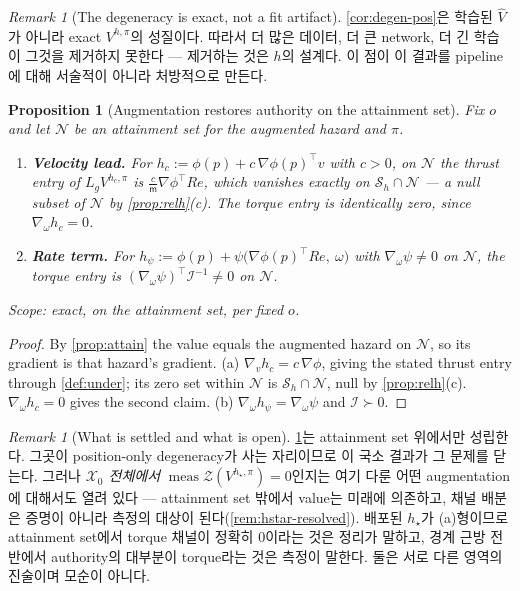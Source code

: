 \documentclass[11pt]{article}
\theoremstyle{plain}
\newtheorem{proposition}[theorem]{Proposition}
\theoremstyle{definition}
\theoremstyle{remark}
\newtheorem{remark}[theorem]{Remark}
\newcommand{\calX}{\mathcal{X}}
\newcommand{\Vhp}[1]{V^{h,#1}}
\newcommand{\Vhpi}{\Vhp{\pi}}
\newcommand{\Vhat}{\widehat V}
\newcommand{\mass}{\mathsf m}
\newcommand{\inertia}{\mathcal I}
\newcommand{\Lg}{L_g}
\newcommand{\grad}{\nabla}
\newcommand{\eqdef}{:=}
\begin{document}
\begin{remark}[The degeneracy is exact, not a fit artifact]\label{rem:vhat}
\cref{cor:degen-pos}은 학습된 $\Vhat$가 아니라 exact $\Vhpi$의 성질이다. 따라서 더 많은 데이터,
더 큰 network, 더 긴 학습이 그것을 제거하지 못한다 --- 제거하는 것은 $h$의 설계다. 이 점이 이
결과를 pipeline에 대해 서술적이 아니라 처방적으로 만든다.
\end{remark}

\begin{proposition}[Augmentation restores authority on the attainment set]\label{prop:lead}
Fix $o$ and let $\mathcal N$ be an attainment set for the augmented hazard and $\pi$.
\begin{enumerate}[label=(\alph*)]
  \item \textbf{Velocity lead.} For $h_c\eqdef\phi(p)+c\,\grad\phi(p)^\top v$ with $c>0$, on
  $\mathcal N$ the thrust entry of $\Lg V^{h_c,\pi}$ is $\tfrac{c}{\mass}\grad\phi^\top Re$,
  which vanishes exactly on $\mathcal S_h\cap\mathcal N$ --- a null subset of $\mathcal N$ by
  \cref{prop:relh}(c). The torque entry is identically zero, since $\grad_\omega h_c=0$.
  \item \textbf{Rate term.} For $h_\psi\eqdef\phi(p)+\psi\big(\grad\phi(p)^\top Re,\ \omega\big)$
  with $\grad_\omega\psi\neq0$ on $\mathcal N$, the torque entry is
  $(\grad_\omega\psi)^\top\inertia^{-1}\neq0$ on $\mathcal N$.
\end{enumerate}
Scope: exact, on the attainment set, per fixed $o$.
\end{proposition}
\begin{proof}
By \cref{prop:attain} the value equals the augmented hazard on $\mathcal N$, so its gradient is
that hazard's gradient. (a) $\grad_vh_c=c\,\grad\phi$, giving the stated thrust entry through
\cref{def:under}; its zero set within $\mathcal N$ is $\mathcal S_h\cap\mathcal N$, null by
\cref{prop:relh}(c). $\grad_\omega h_c=0$ gives the second claim. (b)
$\grad_\omega h_\psi=\grad_\omega\psi$ and $\inertia\succ0$.
\end{proof}

\begin{remark}[What is settled and what is open]\label{rem:global-open}
\cref{prop:lead}는 attainment set 위에서만 성립한다. 그곳이 position-only degeneracy가 사는
자리이므로 이 국소 결과가 그 문제를 닫는다. 그러나 \emph{$\calX_0$ 전체에서}
$\operatorname{meas}\mathcal Z(V^{h_\star,\pi})=0$인지는 여기 다룬 어떤 augmentation에 대해서도
열려 있다 --- attainment set 밖에서 value는 미래에 의존하고, 채널 배분은 증명이 아니라 측정의
대상이 된다(\cref{rem:hstar-resolved}). 배포된 $h_\star$가 (a)형이므로 attainment set에서 torque
채널이 정확히 $0$이라는 것은 정리가 말하고, 경계 근방 전반에서 authority의 대부분이 torque라는
것은 측정이 말한다. 둘은 서로 다른 영역의 진술이며 모순이 아니다.
\end{remark}
\end{document}
